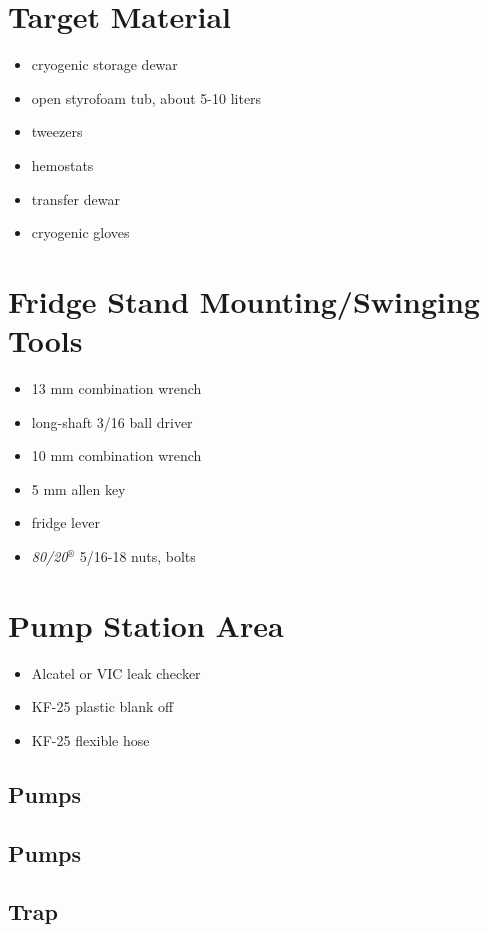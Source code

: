 \section{Target Material}
\begin{itemize}
 \item cryogenic storage \lnn{} dewar
\item open styrofoam tub, about 5-10 liters
\item tweezers
\item hemostats
\item \lnn{} transfer dewar
\item cryogenic gloves
\end{itemize}

\section{Fridge Stand Mounting/Swinging Tools}

\begin{itemize}
  \item 13 mm combination wrench
  \item long-shaft 3/16\inches{} ball driver
  \item 10 mm combination wrench
  \item 5 mm allen key
  \item fridge lever
  \item \textit{80/20$^\circledR$} 5/16\inches{}-18 nuts, bolts
\end{itemize}


\section{Pump Station Area}
  \begin{itemize}
   \item Alcatel or VIC leak checker
   \item KF-25 plastic blank off
   \item KF-25 flexible hose
  \end{itemize}

  \subsection{\het{} Pumps} %
  \subsection{\hef{} Pumps}
  \subsection{\lnn{} Trap}
